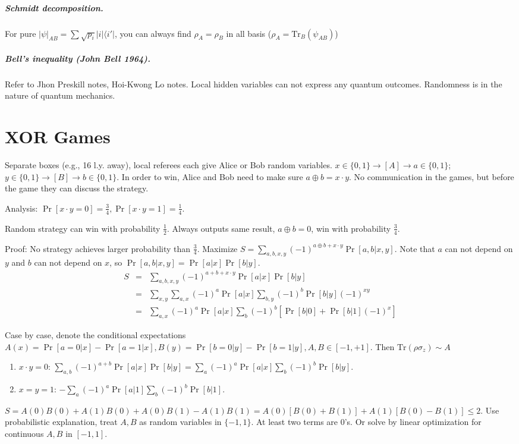 \documentclass{article}
\newcommand{\Tr}{\mathrm{Tr}}
\newcommand{\bra}[1]{\langle #1\vert}
\newcommand{\ket}[1]{\vert #1\vert}
\begin{document}
\begin{spacing}{1.2}
\subparagraph{Schmidt decomposition.}
For pure $\ket{\psi}_{AB} = \sum\sqrt{p_i}\ket{i}\bra{i'}$, you can always find $\rho_A = \rho_B$ in all basis ($\rho_A = \Tr_B(\psi_{AB})$)

\subparagraph{Bell's inequality (John Bell 1964).} Refer to Jhon Preskill notes, Hoi-Kwong Lo notes. Local hidden variables can not express any quantum outcomes. Randomness is in the nature of quantum mechanics.


\section{XOR Games}

Separate boxes (e.g., 16 l.y. away), local referees each give Alice or Bob random variables. $x\in\{0,1\}\to [A] \to a\in\{0,1\}$; $y\in\{0,1\}\to [B]\to b\in\{0,1\}$. In order to win, Alice and Bob need to make sure $a\oplus b = x\cdot y$. No communication in the games, but before the game they can discuss the strategy.

Analysis: $\Pr[x\cdot y = 0] = \frac{3}{4}, \Pr[x\cdot y = 1] = \frac{1}{4}$.

 Random strategy can win with probability $\frac{1}{2}$. Always outputs same result, $a\oplus b = 0$, win with probability $\frac{3}{4}$.
 
Proof: No strategy achieves larger probability than $\frac34$. Maximize $S = \sum_{a,b,x,y} (-1)^{a\oplus b+ x\cdot y}\Pr[a,b\vert x,y]$. Note that $a$ can not depend on $y$ and $b$ can not depend on $x$, so $\Pr[a,b\vert x,y] = \Pr[a\vert x]\Pr[b\vert y]$.
\begin{eqnarray*}
S&=& \sum_{a,b,x,y}(-1)^{a+b+x\cdot y}\Pr[a\vert x]\Pr[b\vert y]\\
&=& \sum_{x,y} \sum_{a,x}(-1)^a\Pr[a\vert x]\sum_{b,y}(-1)^b \Pr[b\vert y](-1)^{xy}\\
&=& \sum_{a,x}(-1)^a \Pr[a\vert x]\sum_{b}(-1)^b\left[ \Pr[b\vert 0]+\Pr[b\vert 1](-1)^x \right]
\end{eqnarray*}

Case by case, denote the conditional expectations $A(x) = \Pr[a =0\vert x] -\Pr[a=1\vert x], B(y) = \Pr[b=0\vert y]-\Pr[b=1\vert y], A,B\in[-1,+1]$. Then $\Tr(\rho \sigma_z)\sim A$
\begin{enumerate}
\item $x\cdot y=0$: $\sum_{a,b} (-1)^{a+b}\Pr[a\vert x]\Pr[b\vert y] = \sum_{a}(-1)^a \Pr[a\vert x] \sum_b (-1)^b \Pr[b\vert y]$.
\item $x = y = 1$: $-\sum_{a}(-1)^a \Pr[a\vert 1] \sum_b (-1)^b \Pr[b\vert 1]$.
\end{enumerate} 
$S = A(0)B(0)+A(1)B(0)+A(0)B(1)-A(1)B(1) = A(0)[B(0)+B(1)]+A(1)[B(0)-B(1)] \leq 2$. Use probabilistic explanation, treat $A,B$ as random variables in $\{-1,1\}$. At least two terms are 0's. Or solve by linear optimization for continuous $A,B$ in $[-1,1]$.



\end{spacing}
\end{document}
